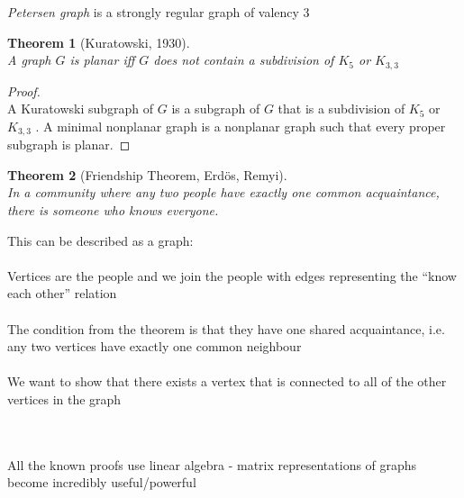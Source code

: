 \documentclass[]{article}
\newtheorem{thm}{Theorem}[section]
\theoremstyle{definition}
\theoremstyle{remark}
\numberwithin{equation}{section}
\begin{document}
	\emph{Petersen graph} is a strongly regular graph of valency 3\\

	\begin{thm}[Kuratowski, 1930]\hfill\\
	A graph $G$ is planar iff $G$ does not contain a subdivision of $K_5$ or $K_{3,3}$
	\end{thm}
	\begin{proof}\hfill\\
	A Kuratowski subgraph of $G$ is a subgraph of $G$ that is a subdivision of $K_5$ or $K_{3,3}$ . A minimal nonplanar graph is a nonplanar graph such that every proper subgraph is planar.
	\end{proof}

	\begin{thm}[Friendship Theorem, Erdös, Remyi]\hfill\\
	In a community where any two people have exactly one common acquaintance, there is someone who knows everyone.
	\end{thm}
	This can be described as a graph:\\
	\\
	Vertices are the people and we join the people with edges representing the “know each other” relation\\
	\\
	The condition from the theorem is that they have one shared acquaintance, i.e. any two vertices have exactly one common neighbour\\
	\\
	We want to show that there exists a vertex that is connected to all of the other vertices in the graph\\
	\\
	\\
	All the known proofs use linear algebra - matrix representations of graphs become incredibly useful/powerful\\
\end{document}
